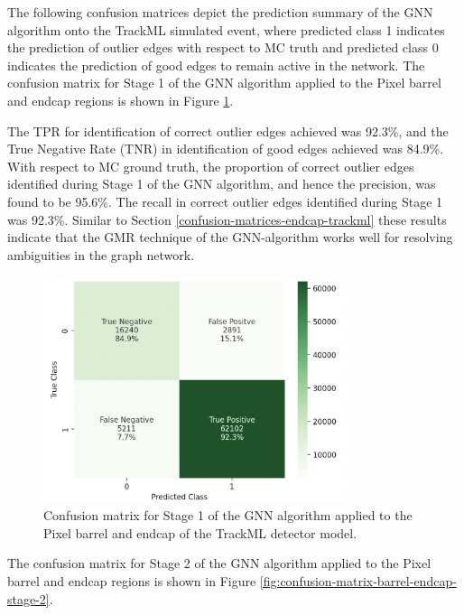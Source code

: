 The following confusion matrices depict the prediction summary of the GNN algorithm onto the TrackML simulated event, where predicted class 1 indicates the prediction of outlier edges with respect to MC truth and predicted class 0 indicates the prediction of good edges to remain active in the network. The confusion matrix for Stage 1 of the GNN algorithm applied to the Pixel barrel and endcap regions is shown in Figure \ref{fig:confusion-matrix-barrel-endcap-stage-1}.


The TPR for identification of correct outlier edges achieved was 92.3\%, and the True Negative Rate (TNR) in identification of good edges achieved was 84.9\%. With respect to MC ground truth, the proportion of correct outlier edges identified during Stage 1 of the GNN algorithm, and hence the precision, was found to be 95.6\%. The recall in correct outlier edges identified during Stage 1 was 92.3\%. Similar to Section \ref{confusion-matrices-endcap-trackml} these results indicate that the GMR technique of the GNN-algorithm works well for resolving ambiguities in the graph network.

\begin{figure}[htbp]
    \centering
    \includegraphics[width=0.79\textwidth]{images/7-results/confusion_matrix_barrel_stage_1.png}
    \caption{Confusion matrix for Stage 1 of the GNN algorithm applied to the Pixel barrel and endcap of the TrackML detector model.}
    \label{fig:confusion-matrix-barrel-endcap-stage-1}%
\end{figure}

The confusion matrix for Stage 2 of the GNN algorithm applied to the Pixel barrel and endcap regions is shown in Figure \ref{fig:confusion-matrix-barrel-endcap-stage-2}.


